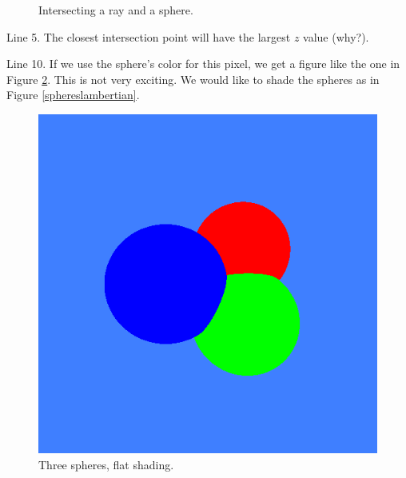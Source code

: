 \documentclass{article}
\newcommand{\mydot}[1]{\draw[fill] (#1) circle (0.1);}
\begin{document}
\begin{description}
\begin{description}
\begin{figure}

    \begin{center}
\end{center}    

    \caption{Intersecting a ray and a sphere.}
    \label{intersectingraysphere}
\end{figure}


\item Line 5.  The closest intersection point will have the largest
  $z$ value (why?).

\item Line 10.
 If we use the
sphere's color for this pixel, we get a figure like the one in Figure
\ref{spheresflat}.  This is not very exciting.  We would like to shade
the spheres as in Figure \ref{sphereslambertian}.

\begin{figure}
  \centerline{\includegraphics[scale=0.5]{threeflatspheres.png}}
  \caption{Three spheres, flat shading.}
  \label{spheresflat}
\end{figure}


\end{description}
\end{description}
\end{document}
